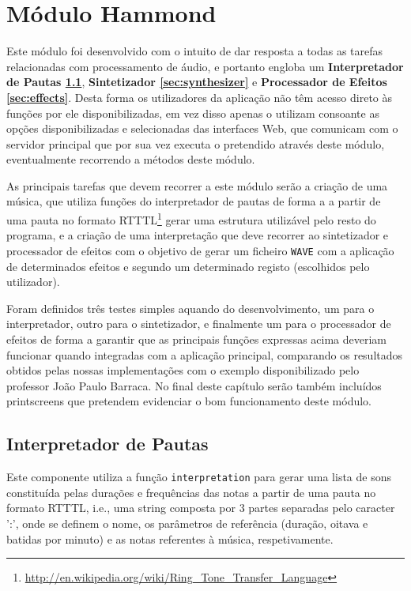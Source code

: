 \documentclass[a4paper,11pt,openright,oneside]{report}
\begin{document}
\chapter{Módulo Hammond}
\label{chap.hammond}

Este módulo foi desenvolvido com o intuito de dar resposta a todas as tarefas relacionadas com processamento de áudio, e portanto engloba um \textbf{Interpretador de Pautas \ref{sec:interpreter}}, \textbf{Sintetizador \ref{sec:synthesizer}} e \textbf{Processador de Efeitos \ref{sec:effects}}. Desta forma os utilizadores da aplicação não têm acesso direto às funções por ele disponibilizadas, em vez disso apenas o utilizam consoante as opções disponibilizadas e selecionadas das interfaces Web, que comunicam com o servidor principal que por sua vez executa o pretendido através deste módulo, eventualmente recorrendo a métodos deste módulo.

As principais tarefas que devem recorrer a este módulo serão a criação de uma música, que utiliza funções do interpretador de pautas de forma a a partir de uma pauta no formato RTTTL\footnote{\url{http://en.wikipedia.org/wiki/Ring_Tone_Transfer_Language}} gerar uma estrutura utilizável pelo resto do programa, e a criação de uma interpretação que deve recorrer ao sintetizador e processador de efeitos com o objetivo de gerar um ficheiro \verb|WAVE| com a aplicação de determinados efeitos e segundo um determinado registo (escolhidos pelo utilizador).

Foram definidos três testes simples aquando do desenvolvimento, um para o interpretador, outro para o sintetizador, e finalmente um para o processador de efeitos de forma a garantir que as principais funções expressas acima deveriam funcionar quando integradas com a aplicação principal, comparando os resultados obtidos pelas nossas implementações com o exemplo disponibilizado pelo professor João Paulo Barraca. No final deste capítulo serão também incluídos printscreens que pretendem evidenciar o bom funcionamento deste módulo.

\section{Interpretador de Pautas}
\label{sec:interpreter}

Este componente utiliza a função \verb|interpretation| para gerar uma lista de sons constituída pelas durações e frequências das notas a partir de uma pauta no formato RTTTL, i.e., uma string composta por 3 partes separadas pelo caracter ':', onde se definem o nome, os parâmetros de referência (duração, oitava e batidas por minuto) e as notas referentes à música, respetivamente.
\end{document}
